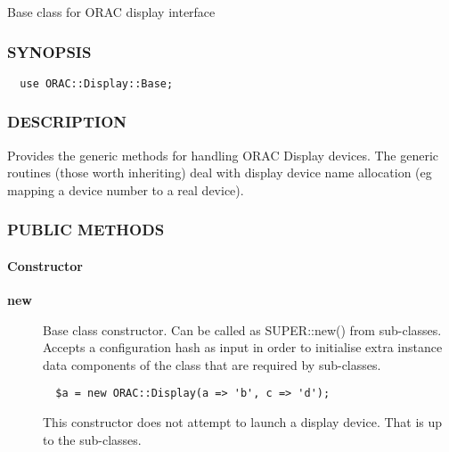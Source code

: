 Base class for ORAC display interface

\subsubsection*{SYNOPSIS\label{ORAC::Display::Base_SYNOPSIS}}
\begin{verbatim}
  use ORAC::Display::Base;
\end{verbatim}
\subsubsection*{DESCRIPTION\label{ORAC::Display::Base_DESCRIPTION}}


Provides the generic methods for handling ORAC Display devices.
The generic routines (those worth inheriting) deal with display
device name allocation (eg mapping a device number to a real device).

\subsubsection*{PUBLIC METHODS\label{ORAC::Display::Base_PUBLIC_METHODS}}
\paragraph*{Constructor\label{ORAC::Display::Base_Constructor}}
\begin{description}

\item[{\textbf{new}}] \mbox{}

Base class constructor. Can be called as SUPER::new() from
sub-classes. Accepts a configuration hash as input in order to
initialise extra instance data components of the class that are
required by sub-classes.

\begin{verbatim}
  $a = new ORAC::Display(a => 'b', c => 'd');
\end{verbatim}


This constructor does not attempt to launch a display device.
That is up to the sub-classes.

\end{description}
